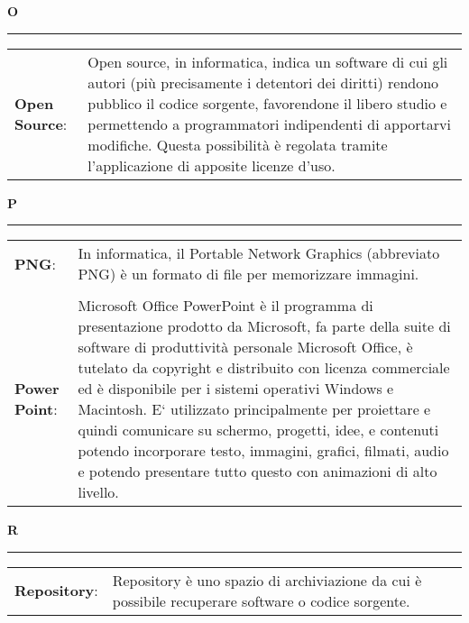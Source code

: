 \hfill\Huge{\textbf{O}}\\
\rule{16cm}{.6pt}
\normalsize
	\begin{longtable}{p{} p{}} 
	    \\
		    \textbf{Open Source}: & Open source, in informatica, indica un software di cui gli autori (più precisamente i detentori dei diritti) rendono pubblico il codice sorgente, favorendone il libero studio e permettendo a programmatori indipendenti di apportarvi modifiche. Questa possibilità è regolata tramite l'applicazione di apposite licenze d'uso.\\
	\end{longtable}
	
	\hfill\Huge{\textbf{P}}\\
\rule{16cm}{.6pt}
\normalsize
	\begin{longtable}{p{} p{}} 
	    \\
		    \textbf{PNG}: & In informatica, il Portable Network Graphics (abbreviato PNG) è un formato di file per memorizzare immagini.\\
		    \\
		    \textbf{Power Point}: & Microsoft Office PowerPoint è il programma di presentazione prodotto da Microsoft, fa parte della suite di software di produttività personale Microsoft Office, è tutelato da copyright e distribuito con licenza commerciale ed è disponibile per i sistemi operativi Windows e Macintosh. E` utilizzato principalmente per proiettare e quindi comunicare su schermo, progetti, idee, e contenuti potendo incorporare testo, immagini, grafici, filmati, audio e potendo presentare tutto questo con animazioni di alto livello.\\
	\end{longtable}
	
\hfill\Huge{\textbf{R}}\\
\rule{16cm}{.6pt}
\normalsize
	\begin{longtable}{p{} p{}} 
	    \\
		    \textbf{Repository}: & Repository è uno spazio di archiviazione da cui è possibile recuperare software o codice sorgente.\\
	\end{longtable}	
	

